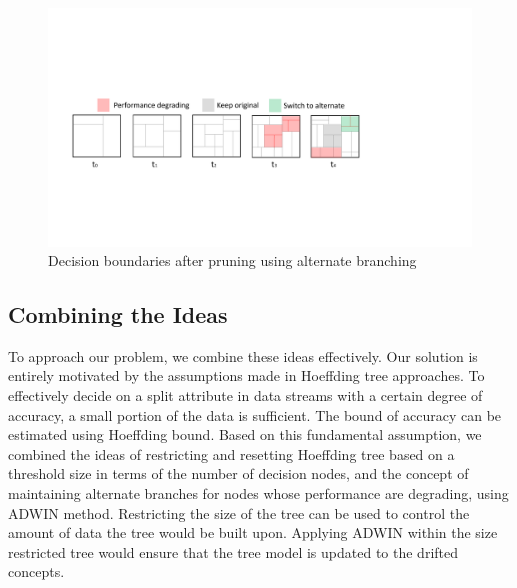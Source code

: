 \begin{figure}[htbp]
    \begin{center}
        \includegraphics[width=14.0cm]{figs/prunedb.pdf}
        \caption{Decision boundaries after pruning using alternate branching}
        \label{fig:algo:prunedb}
    \end{center}
\end{figure}

\subsection{Combining the Ideas}
To approach our problem, we combine these ideas effectively. Our solution is entirely motivated by the assumptions made in Hoeffding tree approaches. To effectively decide on a split attribute in data streams with a certain degree of accuracy, a small portion of the data is  sufficient. The bound of accuracy can be estimated using Hoeffding bound. Based on this fundamental assumption, we combined the ideas of restricting and resetting Hoeffding tree based on a threshold size in terms of the number of decision nodes, and the concept of maintaining alternate branches for nodes whose performance are degrading, using ADWIN method. Restricting the size of the tree can be used to control the amount of data the tree would be built upon. Applying ADWIN within the size restricted tree would ensure that the tree model is updated to the drifted concepts. 

